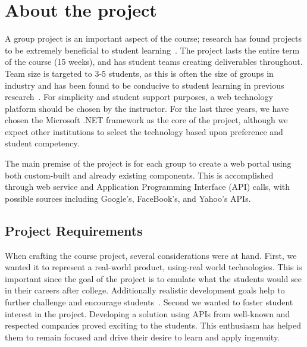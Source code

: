 \documentclass{sig-alternate}
\begin{document}
\section{About the project}
\label{sec: aboutproject}

A group project is an important aspect of the course; research has found projects to be extremely beneficial to student learning~\cite{Schummer:2005:TDS:1149293.1149369,Guo:2009:GPS:1516546.1516579,Coppit:2005:LTP:1047124.1047400}. The project lasts the entire term of the course (15 weeks), and has student teams creating deliverables throughout. Team size is targeted to 3-5 students, as this is often the size of groups in industry and has been found to be conducive to student learning in previous research~\cite{Guo:2009:GPS:1516546.1516579,Petkovic:2006:TPS:1140124.1140202}. For simplicity and student support purposes, a web technology platform should be chosen by the instructor. For the last three years, we have chosen the Microsoft .NET framework as the core of the project, although we expect other institutions to select the technology based upon preference and student competency.

The main premise of the project is for each group to create a web portal using both custom-built and already existing components.  This is accomplished through web service and Application Programming Interface (API) calls, with possible sources including Google's, FaceBook's, and Yahoo's APIs.

\subsection{Project Requirements}

When crafting the course project, several considerations were at hand. First, we wanted it to represent a real-world product, using-real world technologies. This is important since the goal of the project is to emulate what the students would see in their careers after college. Additionally realistic development goals help to further challenge and encourage students~\cite{Schummer:2005:TDS:1149293.1149369,Marmorstein:2011:OSC:1999747.1999823,Tadayon:2004:SEB:1050231.1050248,VanderDuim:2007:GPE:1248820.1248900,Hayes:2002:ESE:872751.873465}. Second we wanted to foster student interest in the project. Developing a solution using APIs from well-known and respected companies proved exciting to the students. This enthusiasm has helped them to remain focused and drive their desire to learn and apply ingenuity.
\end{document}
